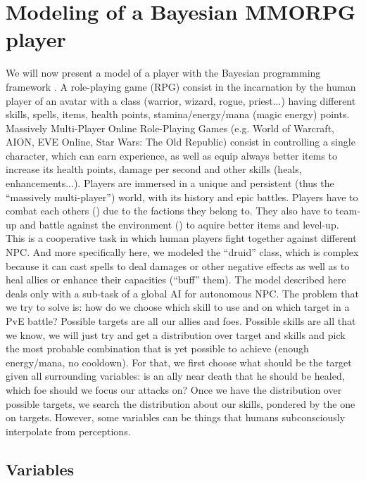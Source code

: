 \section{Modeling of a Bayesian MMORPG player}
We will now present a model of a  player with the Bayesian programming framework \citep{SYNNAEVE:MMORPG}. A role-playing game (RPG) consist in the incarnation by the human player of an avatar with a class (warrior, wizard, rogue, priest...) having different skills, spells, items, health points, stamina/energy/mana (magic energy) points. Massively Multi-Player Online Role-Playing Games (e.g. World of Warcraft, AION, EVE Online, Star Wars: The Old Republic) consist in controlling a single character, which can earn experience, as well as equip always better items to increase its health points, damage per second and other skills (heals, enhancements...). Players are immersed in a unique and persistent (thus the ``massively multi-player'') world, with its history and epic battles. Players have to combat each others () due to the factions they belong to. They also have to team-up and battle against the environment () to aquire better items and level-up. This is a cooperative task in which human players fight together against different NPC. And more specifically here, we modeled the ``druid'' class, which is complex because it can cast spells to deal damages or other negative effects as well as to heal allies or enhance their capacities (``buff'' them). The model described here deals only with a sub-task of a global AI for autonomous NPC. The problem that we try to solve is: how do we choose which skill to use and on which target in a PvE battle? Possible targets are all our allies and foes. Possible skills are all that we know, we will just try and get a distribution over target and skills and pick the most probable combination that is yet possible to achieve (enough energy/mana, no cooldown). For that, we first choose what should be the target given all surrounding variables: is an ally near death that he should be healed, which foe should we focus our attacks on? Once we have the distribution over possible targets, we search the distribution about our skills, pondered by the one on targets. However, some variables can be things that humans subconsciously interpolate from perceptions.

\subsection{Variables}

